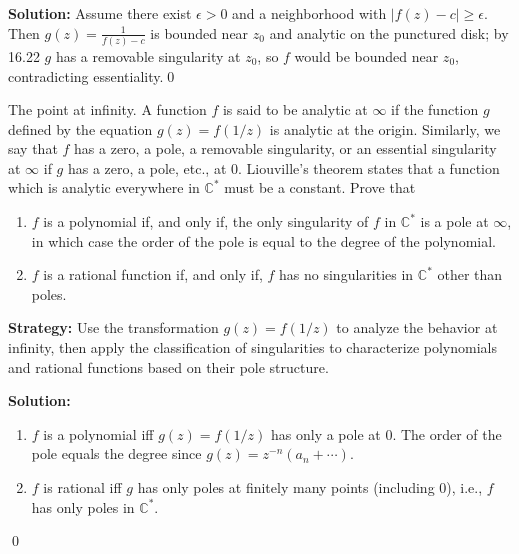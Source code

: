 \bigskip\noindent\textbf{Solution:}
Assume there exist $\epsilon>0$ and a neighborhood with $|f(z)-c|\ge\epsilon$. Then $g(z)=\frac{1}{f(z)-c}$ is bounded near $z_0$ and analytic on the punctured disk; by 16.22 $g$ has a removable singularity at $z_0$, so $f$ would be bounded near $z_0$, contradicting essentiality.\qed


\begin{problembox}
\begin{problemstatement}
The point at infinity. A function \( f \) is said to be analytic at \( \infty \) if the function \( g \) defined by the equation \( g(z) = f(1/z) \) is analytic at the origin. Similarly, we say that \( f \) has a zero, a pole, a removable singularity, or an essential singularity at \( \infty \) if \( g \) has a zero, a pole, etc., at 0. Liouville's theorem states that a function which is analytic everywhere in \( \mathbb{C}^* \) must be a constant. Prove that
\begin{enumerate}[label=(\alph*)]
\item \( f \) is a polynomial if, and only if, the only singularity of \( f \) in \( \mathbb{C}^* \) is a pole at \( \infty \), in which case the order of the pole is equal to the degree of the polynomial.
\item \( f \) is a rational function if, and only if, \( f \) has no singularities in \( \mathbb{C}^* \) other than poles.
\end{enumerate}
\end{problemstatement}
\end{problembox}

\noindent\textbf{Strategy:} Use the transformation \( g(z) = f(1/z) \) to analyze the behavior at infinity, then apply the classification of singularities to characterize polynomials and rational functions based on their pole structure.

\bigskip\noindent\textbf{Solution:}
\begin{enumerate}[label=(\alph*)]
\item $f$ is a polynomial iff $g(z)=f(1/z)$ has only a pole at $0$. The order of the pole equals the degree since $g(z)=z^{-n}(a_n+\cdots)$.
\item $f$ is rational iff $g$ has only poles at finitely many points (including $0$), i.e., $f$ has only poles in $\mathbb C^*$.
\end{enumerate}\qed


